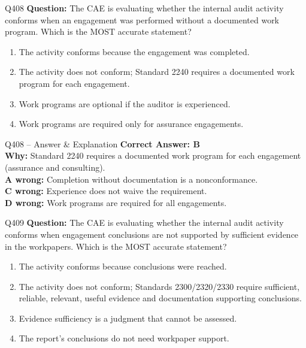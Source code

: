 \documentclass[aspectratio=169,10pt]{beamer}
\begin{document}
	\begin{frame}[t]{Q408}
		\small
		\textbf{Question:} The CAE is evaluating whether the internal audit activity conforms when an engagement was performed without a documented work program. Which is the MOST accurate statement?
		\begin{enumerate}[label=\Alph*.,itemsep=1pt,topsep=2pt]
			\item The activity conforms because the engagement was completed.
			\item The activity does not conform; Standard 2240 requires a documented work program for each engagement.
			\item Work programs are optional if the auditor is experienced.
			\item Work programs are required only for assurance engagements.
		\end{enumerate}
	\end{frame}
	
	\begin{frame}[t]{Q408 -- Answer \& Explanation}
		\small
		\textbf{Correct Answer: B} \\[4pt]
		\textbf{Why:} Standard 2240 requires a documented work program for each engagement (assurance and consulting). \\[4pt]
		\textbf{A wrong:} Completion without documentation is a nonconformance. \\[2pt]
		\textbf{C wrong:} Experience does not waive the requirement. \\[2pt]
		\textbf{D wrong:} Work programs are required for all engagements.
	\end{frame}
	
	\begin{frame}[t]{Q409}
		\small
		\textbf{Question:} The CAE is evaluating whether the internal audit activity conforms when engagement conclusions are not supported by sufficient evidence in the workpapers. Which is the MOST accurate statement?
		\begin{enumerate}[label=\Alph*.,itemsep=1pt,topsep=2pt]
			\item The activity conforms because conclusions were reached.
			\item The activity does not conform; Standards 2300/2320/2330 require sufficient, reliable, relevant, useful evidence and documentation supporting conclusions.
			\item Evidence sufficiency is a judgment that cannot be assessed.
			\item The report's conclusions do not need workpaper support.
		\end{enumerate}
	\end{frame}
	
\end{document}
